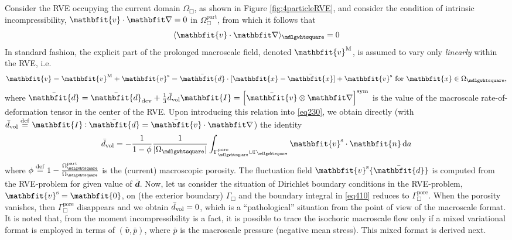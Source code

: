\documentclass[10pt,a4paper,fleqn]{article}
\renewcommand{\ta}[1]{\mathbfit{#1}}
\renewcommand{\ts}[1]{\mathbfit{#1}}
\renewcommand{\Box}{\mdlgwhtsquare}
\newcommand{\pore}{\mathrm{pore}}
\newcommand{\particle}{\mathrm{part}}
\begin{document}
Consider the RVE occupying the current domain $\Omega_\Box$, as shown in Figure \ref{fig:4particleRVE}, and consider the condition of intrinsic incompressibility, $\ta{v}\cdot\diff=0$ in $\Omega_\Box^\particle$, from which it follows that
\begin{equation}
    \langle \ta{v}\cdot\diff \rangle_\Box  = 0
\label{eq230}
\end{equation}
In standard fashion, the explicit part of the prolonged macroscale field, denoted $\ta{v}^\macro$, is assumed to vary only \emph{linearly} within the RVE, i.e.
\begin{equation}
    \ta{v} = \ta{v}^\macro + \ta{v}^\fluct =
    \bar{\ts d} \cdot [\ta{x}-\bar{\ta{x}}] + \ta{v}^\fluct \mbox{ for }\ta{x}\in\Omega_\Box,
    \label{eq409}
\end{equation}
where $\bar{\ts d}=\bar{\ts d}_\dev+\frac{1}{3}\bar{d}_\vol\ts{I}=\left[\bar{\ta v}\outerp\diff\right]^\sym$ is the value of the macroscale rate-of-deformation tensor in the center of the RVE. Upon introducing this relation into \eqref{eq230}, we obtain directly (with $\bar{d}_\vol\defeq\ts{I}\dprod\bar{\ts d}=\bar{\ta v}\cdot\diff$) the identity
\begin{equation}
    \bar{d}_\vol = - \frac{1}{1-\phi}\frac{1}{|\Omega_\Box|}\int_{\Gamma_\Box^\pore\cup\Gamma_\Box} \ta{v}^\fluct\cdot\ta{n} \dif a
    \label{eq410}
\end{equation}
where $\phi\defeq 1-\frac{\Omega_\Box^\particle}{\Omega_\Box}$ is the (current) macroscopic porosity. The fluctuation field $\ta{v}^\fluct\{\bar{\ts d}\}$ is computed from the RVE-problem for given value of $\bar{\ts d}$. Now, let us consider the situation of Dirichlet boundary conditions in the RVE-problem, $\ta{v}^\fluct=\ta{0}$, on (the exterior boundary) $\Gamma_\Box$ and the boundary integral in \eqref{eq410} reduces to $\Gamma_\Box^\pore$. When the porosity vanishes, then $\Gamma_\Box^\pore$ disappears and we obtain $\bar{d}_{\mathrm{vol}} = 0$, which is a ``pathological'' situation from the point of view of the macroscale format. It is noted that, from the moment incompressibility is a fact, it is possible to trace the isochoric macroscale flow only if a mixed variational format is employed in terms of $(\bar{\ta v},\bar{p})$, where $\bar{p}$ is the macroscale pressure (negative mean stress). This mixed format is derived next.
\end{document}
